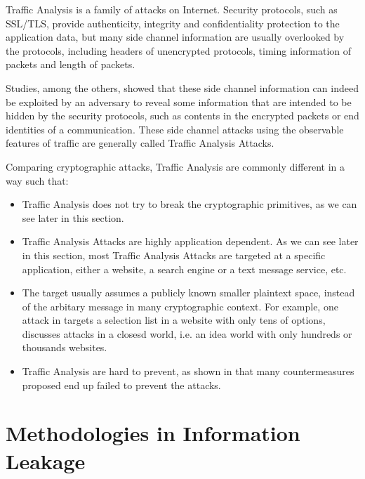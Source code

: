 Traffic Analysis is a family of attacks on Internet. Security protocols, such as SSL/TLS,  provide authenticity, integrity and confidentiality protection to the application data, but many side channel information are usually overlooked by the protocols, including headers of unencrypted protocols, timing information of packets and length of packets. 

Studies, \cite{WebSideChannel}\cite{PinpointWeb}\cite{Peekaboo} among the others, showed that these side channel information can indeed be exploited by an adversary to reveal some information that are intended to be hidden by the security protocols, such as contents in the encrypted packets or end identities of a communication. These side channel attacks using the observable features of traffic are generally called Traffic Analysis Attacks.

Comparing cryptographic attacks, Traffic Analysis are commonly different in a way such that:
\begin{itemize}
	\item Traffic Analysis does not try to break the cryptographic primitives, as we can see later in this section. 
	\item Traffic Analysis Attacks are highly application dependent. As we can see later in this section, most Traffic Analysis Attacks are targeted at a specific application, either a website, a search engine or a text message service, etc.
	\item The target usually assumes a publicly known smaller plaintext space, instead of the arbitary message in many cryptographic context. For example, one attack in \cite{WebSideChannel} targets a selection list in a website with only tens of options,  \cite{Peekaboo} discusses attacks in a closesd world, i.e. an idea world with only hundreds or thousands websites.
	\item Traffic Analysis are hard to prevent, as shown in \cite{Peekaboo} that many countermeasures proposed end up failed to prevent the attacks.
\end{itemize}



\section{Methodologies in Information Leakage }

